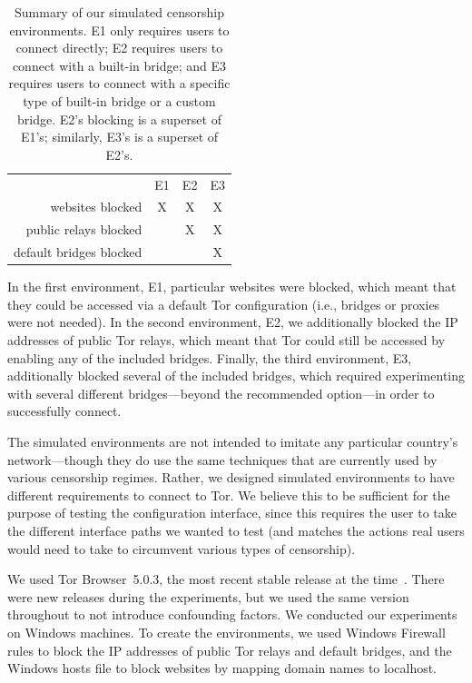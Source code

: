 \documentclass[USenglish,oneside,twocolumn]{article}
\begin{document}
\begin{table}[t]
\centering
\begin{tabular}{r c c c}
& E1 & E2 & E3 \\
websites blocked & X & X & X \\
public relays blocked & & X & X \\
default bridges blocked & & & X \\
\end{tabular}
\caption{
Summary of our simulated censorship environments.
E1 only requires users to connect directly;
E2 requires users to connect with a built-in bridge;
and E3 requires users to connect with a specific type of built-in bridge
or a custom bridge.
E2's blocking is a superset of E1's;
similarly, E3's is a superset of E2's.
}
\label{tab:environments}
\end{table}

In the first environment, E1, particular websites were blocked, which meant that they could be accessed via a default Tor configuration (i.e., bridges or proxies were not needed). In the second environment, E2, we additionally blocked the IP addresses of public Tor relays, which meant that Tor could still be accessed by enabling any of the included bridges. Finally, the third environment, E3, additionally blocked several of the included bridges, which required experimenting with several different bridges---beyond the recommended option---in order to successfully connect.

The simulated environments are not intended to imitate any particular country's network---though they do use the same techniques that are currently used by various censorship regimes. Rather, we designed simulated environments to have different requirements to connect to Tor. We believe this to be sufficient for the purpose of testing the configuration interface, since this requires the user to take the different interface paths we wanted to test (and matches the actions real users would need to take to circumvent various types of censorship).

We used Tor Browser~5.0.3, the most recent stable release at the time~\cite{torbrowser-503}.
There were new releases during the experiments, but we used the same version throughout to not introduce confounding factors. We conducted our experiments on Windows machines. To create the environments, we used Windows Firewall rules to block the IP addresses of public Tor relays and default bridges, and the Windows hosts file to block websites by mapping domain names to localhost. 
\end{document}
